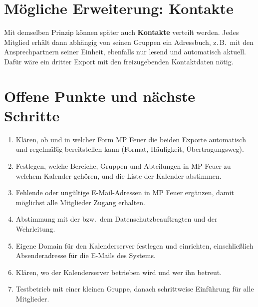 \documentclass[a4paper,fontsize=10pt]{scrartcl}
\begin{document}
\section{Mögliche Erweiterung: Kontakte}

Mit demselben Prinzip können später auch \textbf{Kontakte} verteilt werden.
Jedes Mitglied erhält dann abhängig von seinen Gruppen ein Adressbuch, z.\,B.\
mit den Ansprechpartnern seiner Einheit, ebenfalls nur lesend und automatisch
aktuell. Dafür wäre ein dritter Export mit den freizugebenden Kontaktdaten
nötig.

\section{Offene Punkte und nächste Schritte}

\begin{enumerate}
  \item Klären, ob und in welcher Form MP Feuer die beiden Exporte
        automatisch und regelmäßig bereitstellen kann (Format, Häufigkeit,
        Übertragungsweg).
  \item Festlegen, welche Bereiche, Gruppen und Abteilungen in MP Feuer zu
        welchem Kalender gehören, und die Liste der Kalender abstimmen.
  \item Fehlende oder ungültige E-Mail-Adressen in MP Feuer ergänzen, damit
        möglichst alle Mitglieder Zugang erhalten.
  \item Abstimmung mit der bzw.\ dem Datenschutzbeauftragten und der
        Wehrleitung.
  \item Eigene Domain für den Kalenderserver festlegen und einrichten,
        einschließlich Absenderadresse für die E-Mails des Systems.
  \item Klären, wo der Kalenderserver betrieben wird und wer ihn betreut.
  \item Testbetrieb mit einer kleinen Gruppe, danach schrittweise Einführung
        für alle Mitglieder.
\end{enumerate}
\end{document}
